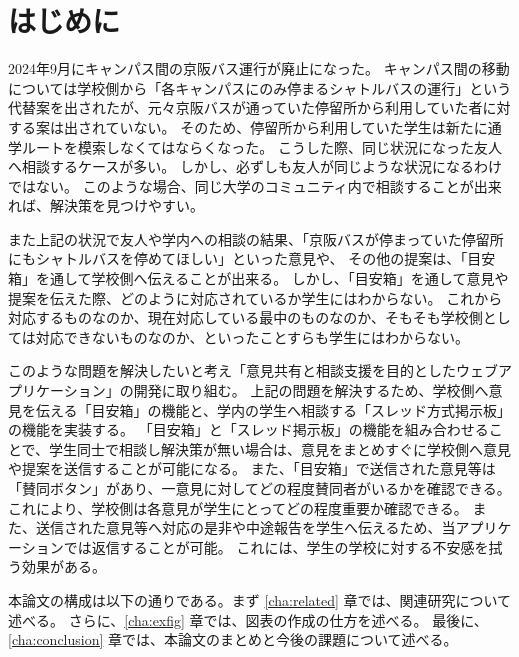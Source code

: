 \documentclass[main]{subfiles}
\begin{document}
\chapter{はじめに}
\label{cha:intro}

2024年9月にキャンパス間の京阪バス運行が廃止になった。
キャンパス間の移動については学校側から「各キャンパスにのみ停まるシャトルバスの運行」という代替案を出されたが、元々京阪バスが通っていた停留所から利用していた者に対する案は出されていない。
そのため、停留所から利用していた学生は新たに通学ルートを模索しなくてはならくなった。
こうした際、同じ状況になった友人へ相談するケースが多い。
しかし、必ずしも友人が同じような状況になるわけではない。
このような場合、同じ大学のコミュニティ内で相談することが出来れば、解決策を見つけやすい。

また上記の状況で友人や学内への相談の結果、「京阪バスが停まっていた停留所にもシャトルバスを停めてほしい」といった意見や、
その他の提案は、「目安箱」を通して学校側へ伝えることが出来る。
しかし、「目安箱」を通して意見や提案を伝えた際、どのように対応されているか学生にはわからない。
これから対応するものなのか、現在対応している最中のものなのか、そもそも学校側としては対応できないものなのか、といったことすらも学生にはわからない。

このような問題を解決したいと考え「意見共有と相談支援を目的としたウェブアプリケーション」の開発に取り組む。
上記の問題を解決するため、学校側へ意見を伝える「目安箱」の機能と、学内の学生へ相談する「スレッド方式掲示板」の機能を実装する。
「目安箱」と「スレッド掲示板」の機能を組み合わせることで、学生同士で相談し解決策が無い場合は、意見をまとめすぐに学校側へ意見や提案を送信することが可能になる。
また、「目安箱」で送信された意見等は「賛同ボタン」があり、一意見に対してどの程度賛同者がいるかを確認できる。
これにより、学校側は各意見が学生にとってどの程度重要か確認できる。
また、送信された意見等へ対応の是非や中途報告を学生へ伝えるため、当アプリケーションでは返信することが可能。
これには、学生の学校に対する不安感を拭う効果がある。


本論文の構成は以下の通りである。まず \ref{cha:related} 章では、関連研究について述べる。
さらに、\ref{cha:exfig} 章では、図表の作成の仕方を述べる。
最後に、\ref{cha:conclusion} 章では、本論文のまとめと今後の課題について述べる。
\end{document}
